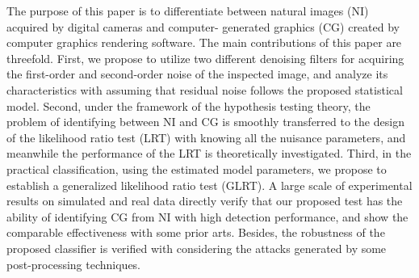 

\begin{eabstract}
The purpose of this paper is to differentiate between natural images (NI) acquired by digital cameras and computer- generated graphics (CG) created by computer graphics rendering software. The main contributions of this paper are threefold. First, we propose to utilize two different denoising filters for acquiring the first-order and second-order noise of the inspected image, and analyze its characteristics with assuming that residual noise follows the proposed statistical model. Second, under the framework of the hypothesis testing theory, the problem of identifying between NI and CG is smoothly transferred to the design of the likelihood ratio test (LRT) with knowing all the nuisance parameters, and meanwhile the performance of the LRT is theoretically investigated. Third, in the practical classification, using the estimated model parameters, we propose to establish a generalized likelihood ratio test (GLRT). A large scale of experimental results on simulated and real data directly verify that our proposed test has the ability of identifying CG from NI with high detection performance, and show the comparable effectiveness with some prior arts. Besides, the robustness of the proposed classifier is verified with considering the attacks generated by some post-processing techniques.
\end{eabstract}

